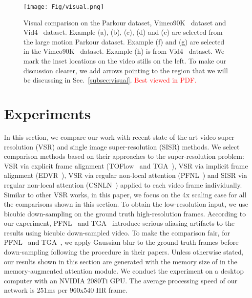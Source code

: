 \begin{figure*}[t]
    \centering
    \texttt{[image: Fig/visual.png]}
    \caption{Visual comparison on the Parkour dataset, Vimeo90K~\cite{vimeo90k} dataset and Vid4~\cite{frvsr} dataset. Example (a), (b), (c), (d) and (e) are selected from the large motion Parkour dataset. Example (f) and (g) are selected in the Vimeo90K~\cite{vimeo90k} dataset. Example (h) is from Vid4~\cite{frvsr} dataset. We mark the inset locations on the video stills on the left. To make our discussion clearer, we add arrows pointing to the region that we will be discussing in Sec.~\ref{subsec:visual}. \textcolor{red}{Best viewed in PDF.}}
    \label{fig:visual}
    \vspace{-10pt}
\end{figure*}

\section{Experiments}\label{sec:result}
In this section, we compare our work with recent state-of-the-art video super-resolution (VSR) and single image super-resolution (SISR) methods.
We select comparison methods based on their approaches to the super-resolution problem: VSR via explicit frame alignment (TOFlow~\cite{vimeo90k} and TGA~\cite{tga}), VSR via implicit frame alignment (EDVR~\cite{edvr}), VSR via regular non-local attention (PFNL~\cite{pfnl}) and SISR via regular non-local attention (CSNLN~\cite{mei}) applied to each video frame individually.
Similar to other VSR works, in this paper, we focus on the 4x scaling case for all the comparisons shown in this section.
To obtain the low-resolution input, we use bicubic down-sampling on the ground truth high-resolution frames.
According to our experiment, PFNL~\cite{pfnl} and TGA~\cite{tga} introduce serious aliasing artifacts to the results using bicubic down-sampled video.
To make the comparison fair, for PFNL~\cite{pfnl} and TGA~\cite{tga}, we apply Gaussian blur to the ground truth frames before down-sampling following the procedure in their papers.
Unless otherwise stated, our results shown in this section are generated with the memory size of  in the memory-augmented attention module.
We conduct the experiment on a desktop computer with an NVIDIA 2080Ti GPU.
The average processing speed of our network is 251ms per 960x540 HR frame. 

